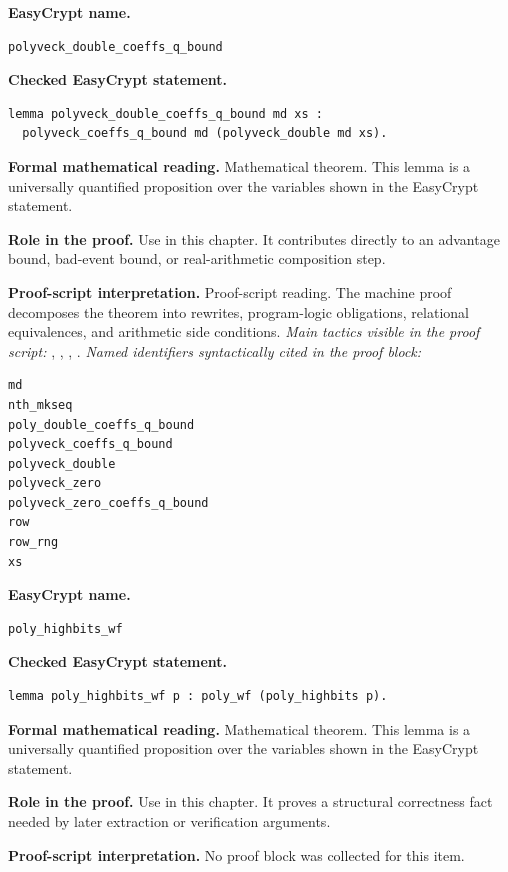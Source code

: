 \begin{formaltheorem}
\noindent\textbf{EasyCrypt name.}
\begin{lstlisting}[language=EasyCrypt,basicstyle=\ttfamily\scriptsize]
polyveck_double_coeffs_q_bound
\end{lstlisting}
\noindent\textbf{Checked EasyCrypt statement.}
\begin{lstlisting}[language=EasyCrypt,basicstyle=\ttfamily\scriptsize]
lemma polyveck_double_coeffs_q_bound md xs :
  polyveck_coeffs_q_bound md (polyveck_double md xs).
\end{lstlisting}
\noindent\textbf{Formal mathematical reading.}
Mathematical theorem. This lemma is a universally quantified proposition over the variables shown in the EasyCrypt statement.

\noindent\textbf{Role in the proof.}
Use in this chapter. It contributes directly to an advantage bound, bad-event bound, or real-arithmetic composition step.

\noindent\textbf{Proof-script interpretation.}
Proof-script reading. The machine proof decomposes the theorem into rewrites, program-logic obligations, relational equivalences, and arithmetic side conditions.
\emph{Main tactics visible in the proof script:} , , , .
\emph{Named identifiers syntactically cited in the proof block:}
\begin{lstlisting}[language=EasyCrypt,basicstyle=\ttfamily\scriptsize]
md
nth_mkseq
poly_double_coeffs_q_bound
polyveck_coeffs_q_bound
polyveck_double
polyveck_zero
polyveck_zero_coeffs_q_bound
row
row_rng
xs
\end{lstlisting}

\end{formaltheorem}

\begin{formaltheorem}
\noindent\textbf{EasyCrypt name.}
\begin{lstlisting}[language=EasyCrypt,basicstyle=\ttfamily\scriptsize]
poly_highbits_wf
\end{lstlisting}
\noindent\textbf{Checked EasyCrypt statement.}
\begin{lstlisting}[language=EasyCrypt,basicstyle=\ttfamily\scriptsize]
lemma poly_highbits_wf p : poly_wf (poly_highbits p).
\end{lstlisting}
\noindent\textbf{Formal mathematical reading.}
Mathematical theorem. This lemma is a universally quantified proposition over the variables shown in the EasyCrypt statement.

\noindent\textbf{Role in the proof.}
Use in this chapter. It proves a structural correctness fact needed by later extraction or verification arguments.

\noindent\textbf{Proof-script interpretation.}
No proof block was collected for this item.

\end{formaltheorem}


